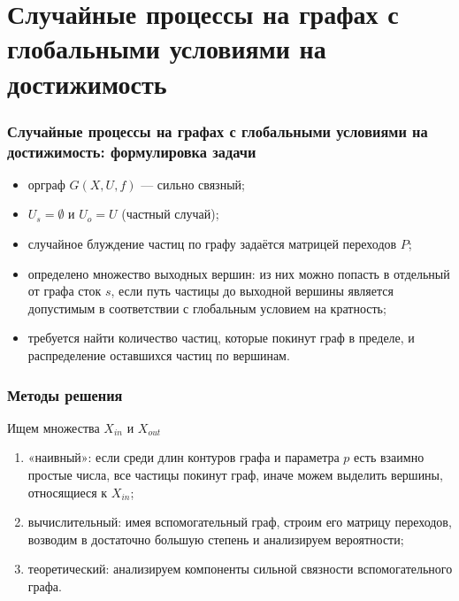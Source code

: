 \documentclass{beamer}
\begin{document}
\section{Случайные процессы на графах с глобальными условиями на достижимость}

\begin{frame}\frametitle{Случайные процессы на графах с глобальными условиями на достижимость: формулировка задачи}

	\begin{itemize}
		\item орграф $G(X,U,f)$ --- сильно связный;
		
		\item $U_s = \emptyset$ и $U_o = U$ (частный случай);
		
		\item случайное блуждение частиц по графу задаётся матрицей переходов $P$;
		
		\item определено множество выходных вершин: из них можно попасть в отдельный от графа сток $s$, если путь частицы до выходной вершины является допустимым в соответствии с глобальным условием на кратность;
		
		\item требуется найти количество частиц, которые покинут граф в пределе, и распределение оставшихся частиц по вершинам.
	\end{itemize}

\end{frame}


\begin{frame}\frametitle{Методы решения}

	\begin{block}{Ищем множества $X_{in}$ и $X_{out}$}
	
		\begin{enumerate}
			\item «наивный»: если среди длин контуров графа и параметра $p$ есть взаимно простые числа, все частицы покинут граф, иначе можем выделить вершины, относящиеся к $X_{in}$;
			
			\item вычислительный: имея вспомогательный граф, строим его матрицу переходов, возводим в достаточно большую степень и анализируем вероятности;
			
			\item теоретический: анализируем компоненты сильной связности вспомогательного графа.
		\end{enumerate}
	
	\end{block}

\end{frame}
\end{document}

